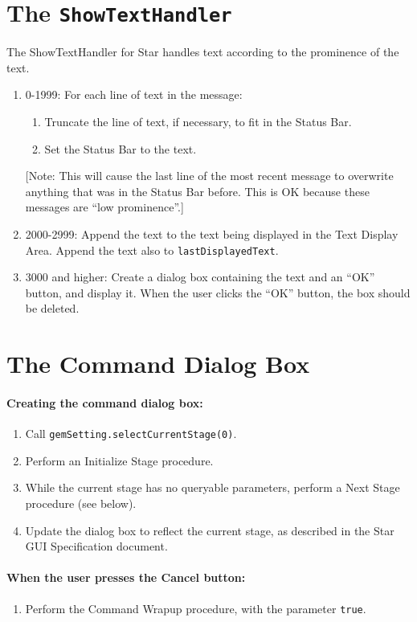\documentclass[11pt]{article}
\begin{document}
\section{The {\tt ShowTextHandler}}

The ShowTextHandler for Star handles text according to the prominence of
the text.
\begin{enumerate}
\item 0-1999:  For each line of text in the message:
  \begin{enumerate}
  \item Truncate the line of text, if necessary, to fit in the Status Bar.
  \item Set the Status Bar to the text.
  \end{enumerate}
  [Note: This will cause the last line of the most recent message to
  overwrite anything that was in the Status Bar before.  This is OK
  because these messages are ``low prominence''.]
\item 2000-2999:  Append the text to the text being displayed in the
  Text Display Area.  Append the text also to {\tt lastDisplayedText}.
\item 3000 and higher:  Create a dialog box containing the text and an
  ``OK'' button, and display it.  When the user clicks the ``OK'' button,
  the box should be deleted.
\end{enumerate}

\section{The Command Dialog Box}

\paragraph{Creating the command dialog box:}
\begin{enumerate}
\item Call {\tt gemSetting.selectCurrentStage(0)}.
\item Perform an Initialize Stage procedure.
\item While the current stage has no queryable parameters, perform
  a Next Stage procedure (see below).
\item Update the dialog box to reflect the current stage, as described
  in the Star GUI Specification document.
\end{enumerate}

\paragraph{When the user presses the Cancel button:}
\begin{enumerate}
\item Perform the Command Wrapup procedure, with the parameter {\tt true}.
\end{enumerate}
\end{document}
